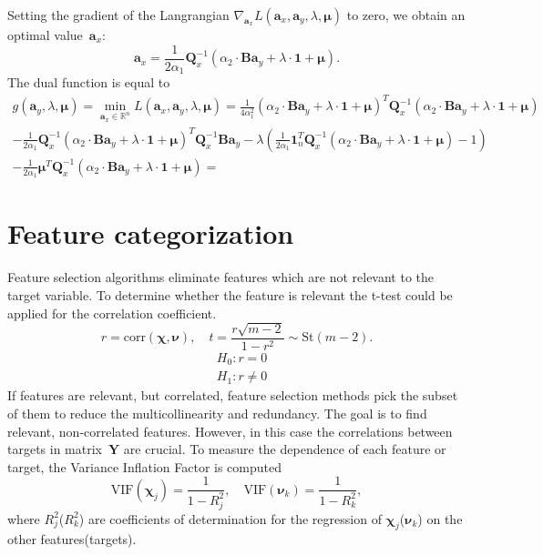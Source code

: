 \documentclass[12pt,twoside]{article}
\newcommand{\ba}{\mathbf{a}}
\newcommand{\bY}{\mathbf{Y}}
\newcommand{\bB}{\mathbf{B}}
\newcommand{\bQ}{\mathbf{Q}}
\newcommand{\bbR}{\mathbb{R}}
\newcommand{\bchi}{\boldsymbol{\chi}}
\newcommand{\bnu}{\boldsymbol{\nu}}
\newcommand{\bOne}{\boldsymbol{1}}
\begin{document}
Setting the gradient of the Langrangian $\nabla_{\ba_x} L(\ba_x, \ba_y, \lambda, \boldsymbol{\mu})$ to zero, we obtain an optimal value~$\ba_x$:
\[
	\ba_x = \frac{1}{2\alpha_1} \bQ_x^{-1} \left( \alpha_2 \cdot \bB \ba_y +\lambda \cdot \bOne + \boldsymbol{\mu} \right).
\]
The dual function is equal to
\begin{multline*}
	g(\ba_y, \lambda, \boldsymbol{\mu}) = \min_{\ba_x \in \bbR^n} L(\ba_x, \ba_y, \lambda, \boldsymbol{\mu}) = \frac{1}{4\alpha_1^2} \left( \alpha_2 \cdot \bB \ba_y +\lambda \cdot \bOne + \boldsymbol{\mu} \right)^T \bQ_x^{-1} \left( \alpha_2 \cdot \bB \ba_y +\lambda \cdot \bOne + \boldsymbol{\mu} \right) \\
	- \frac{1}{2\alpha_1} \bQ_x^{-1} \left( \alpha_2 \cdot \bB \ba_y +\lambda \cdot \bOne + \boldsymbol{\mu} \right)^T \bQ_x^{-1} \bB \ba_y - \lambda \left( \frac{1}{2\alpha_1} \bOne_n ^T \bQ_x^{-1} \left( \alpha_2 \cdot \bB \ba_y +\lambda \cdot \bOne + \boldsymbol{\mu} \right) - 1 \right) \\
	- \frac{1}{2\alpha_1} \boldsymbol{\mu}^T \bQ_x^{-1} \left( \alpha_2 \cdot \bB \ba_y +\lambda \cdot \bOne + \boldsymbol{\mu} \right) = 
\end{multline*}

\section{Feature categorization}
Feature selection algorithms eliminate features which are not relevant to the target variable. 
To determine whether the feature is relevant the t-test could be applied for the correlation coefficient.
\[
	r = \text{corr} (\bchi, \bnu), \quad t = \frac{r \sqrt{m - 2}}{1 - r^2} \sim \text{St} (m - 2).
\]
\begin{align*}
&H_0: r = 0 \\
&H_1: r \neq 0
\end{align*}
If features are relevant, but correlated, feature selection methods pick the subset of them to reduce the multicollinearity and redundancy.
The goal is to find relevant, non-correlated features. 
However, in this case the correlations between targets in matrix~$\bY$ are crucial.
To measure the dependence of each feature or target, the Variance Inflation Factor is computed
\[
	\text{VIF}(\bchi_j) = \frac{1}{1 - R_j^2}, \quad \text{VIF}(\bnu_k) = \frac{1}{1 - R_k^2},
\]
where $R_j^2$($R_k^2$) are coefficients of determination for the regression of $\bchi_j$($\bnu_k$) on the other features(targets).
\end{document}
